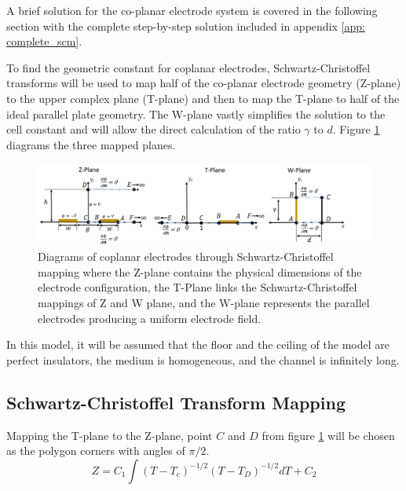     \par A brief solution for the co-planar electrode system is covered in the following section with the complete step-by-step solution included in appendix \ref{app: complete_scm}.
    
    \par To find the geometric constant for coplanar electrodes, Schwartz-Christoffel transforms will be used to map half of the co-planar electrode geometry (Z-plane) to the upper complex plane (T-plane) and then to map the T-plane to half of the ideal parallel plate geometry. The W-plane vastly simplifies the solution to the cell constant and will allow the direct calculation of the ratio $\gamma$ to $d$. Figure \ref{fig:scm_planes_models} diagrams the three mapped planes. 
  \begin{figure}[H]
        \centering
        \includegraphics[width=\textwidth]{images/scmPlanes.png}
        \caption[Diagrams of coplanar electrodes through Schwartz-Christoffel mapping]{Diagrams of coplanar electrodes through Schwartz-Christoffel mapping where the Z-plane contains the physical dimensions of the electrode configuration, the T-Plane links the Schwartz-Christoffel mappings of Z and W plane, and the W-plane represents the parallel electrodes producing a uniform electrode field.}
        \label{fig:scm_planes_models}
    \end{figure}

\par In this model, it will be assumed that the floor and the ceiling of the model are perfect insulators, the medium is homogeneous, and the channel is infinitely long.

\subsection*{Schwartz-Christoffel Transform Mapping}

  \par Mapping the T-plane to the Z-plane, point $C$ and $D$ from figure \ref{fig:scm_planes_models} will be chosen as the polygon corners with angles of $\pi/2$.  
   \begin{equation}
      Z = C_1\int (T-T_c)^{-1/2}(T-T_D)^{-1/2}dT + C_2
      \label{eqn:SCM_ZT_int}
  \end{equation}
  

